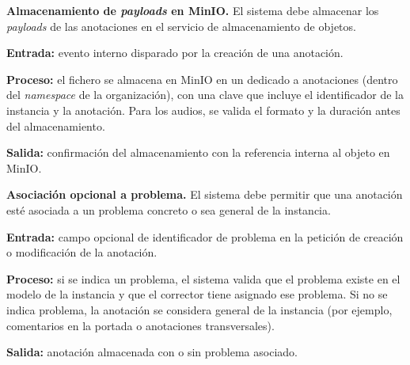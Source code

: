 \begin{functional}
    \item \textbf{Almacenamiento de \textit{payloads} en MinIO.}
    \label{rf:annotations:storage}
    El sistema debe almacenar los \textit{payloads} de las anotaciones en el servicio de
    almacenamiento de objetos.

    \textbf{Entrada:} evento interno disparado por la creación de una anotación.

    \textbf{Proceso:} el fichero se almacena en MinIO en un  dedicado a
    anotaciones (dentro del \textit{namespace} de la organización), con una clave que
    incluye el identificador de la instancia y la anotación. Para los audios, se valida el
    formato y la duración antes del almacenamiento.

    \textbf{Salida:} confirmación del almacenamiento con la referencia interna al objeto en
    MinIO.

    \item \textbf{Asociación opcional a problema.} \label{rf:annotations:problem}
    El sistema debe permitir que una anotación esté asociada a un problema concreto o sea
    general de la instancia.

    \textbf{Entrada:} campo opcional de identificador de problema en la petición de creación
    o modificación de la anotación.

    \textbf{Proceso:} si se indica un problema, el sistema valida que el problema existe en
    el modelo de la instancia y que el corrector tiene asignado ese problema. Si no se
    indica problema, la anotación se considera general de la instancia (por ejemplo,
    comentarios en la portada o anotaciones transversales).

    \textbf{Salida:} anotación almacenada con o sin problema asociado.

\end{functional}
